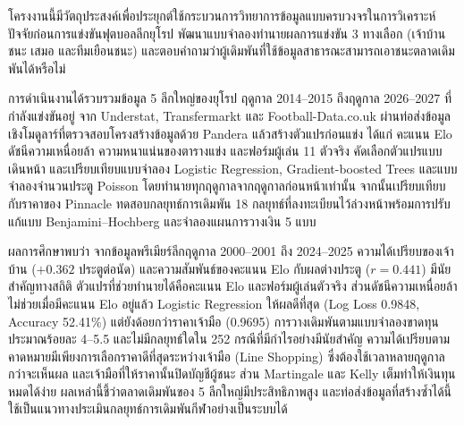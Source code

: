 โครงงานนี้มีวัตถุประสงค์เพื่อประยุกต์ใช้กระบวนการวิทยาการข้อมูลแบบครบวงจรในการวิเคราะห์ปัจจัยก่อนการแข่งขันฟุตบอลลีกยุโรป พัฒนาแบบจำลองทำนายผลการแข่งขัน 3 ทางเลือก (เจ้าบ้านชนะ เสมอ และทีมเยือนชนะ) และตอบคำถามว่าผู้เดิมพันที่ใช้ข้อมูลสาธารณะสามารถเอาชนะตลาดเดิมพันได้หรือไม่

การดำเนินงานได้รวบรวมข้อมูล 5 ลีกใหญ่ของยุโรป ฤดูกาล 2014--2015 ถึงฤดูกาล 2026--2027 ที่กำลังแข่งขันอยู่ จาก Understat, Transfermarkt และ Football-Data.co.uk ผ่านท่อส่งข้อมูลเชิงโมดูลาร์ที่ตรวจสอบโครงสร้างข้อมูลด้วย Pandera แล้วสร้างตัวแปรก่อนแข่ง ได้แก่ คะแนน Elo ดัชนีความเหนื่อยล้า ความหนาแน่นของตารางแข่ง และฟอร์มผู้เล่น 11 ตัวจริง คัดเลือกตัวแปรแบบเดินหน้า และเปรียบเทียบแบบจำลอง Logistic Regression, Gradient-boosted Trees และแบบจำลองจำนวนประตู Poisson โดยทำนายทุกฤดูกาลจากฤดูกาลก่อนหน้าเท่านั้น จากนั้นเปรียบเทียบกับราคาของ Pinnacle ทดสอบกลยุทธ์การเดิมพัน 18 กลยุทธ์ที่ลงทะเบียนไว้ล่วงหน้าพร้อมการปรับแก้แบบ Benjamini--Hochberg และจำลองแผนการวางเงิน 5 แบบ

ผลการศึกษาพบว่า จากข้อมูลพรีเมียร์ลีกฤดูกาล 2000--2001 ถึง 2024--2025 ความได้เปรียบของเจ้าบ้าน ($+0.362$ ประตูต่อนัด) และความสัมพันธ์ของคะแนน Elo กับผลต่างประตู ($r = 0.441$) มีนัยสำคัญทางสถิติ ตัวแปรที่ช่วยทำนายได้คือคะแนน Elo และฟอร์มผู้เล่นตัวจริง ส่วนดัชนีความเหนื่อยล้าไม่ช่วยเมื่อมีคะแนน Elo อยู่แล้ว Logistic Regression ให้ผลดีที่สุด (Log Loss 0.9848, Accuracy 52.41\%) แต่ยังด้อยกว่าราคาเจ้ามือ (0.9695) การวางเดิมพันตามแบบจำลองขาดทุนประมาณร้อยละ 4--5.5 และไม่มีกลยุทธ์ใดใน 252 กรณีที่มีกำไรอย่างมีนัยสำคัญ ความได้เปรียบตามคาดหมายมีเพียงการเลือกราคาดีที่สุดระหว่างเจ้ามือ (Line Shopping) ซึ่งต้องใช้เวลาหลายฤดูกาลกว่าจะเห็นผล และเจ้ามือที่ให้ราคานั้นปิดบัญชีผู้ชนะ ส่วน Martingale และ Kelly เต็มทำให้เงินทุนหมดได้ง่าย ผลเหล่านี้ชี้ว่าตลาดเดิมพันของ 5 ลีกใหญ่มีประสิทธิภาพสูง และท่อส่งข้อมูลที่สร้างซ้ำได้นี้ใช้เป็นแนวทางประเมินกลยุทธ์การเดิมพันกีฬาอย่างเป็นระบบได้
